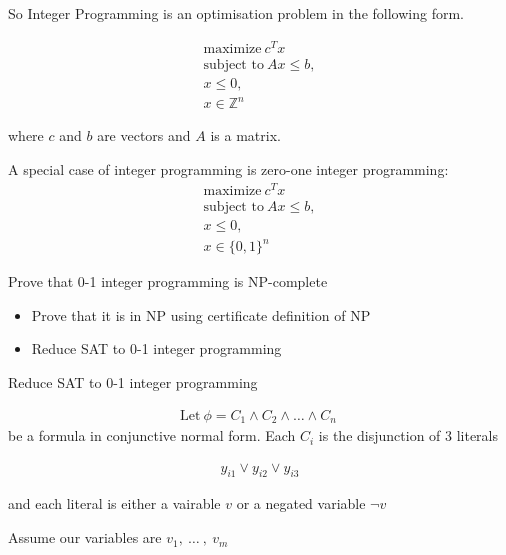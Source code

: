 \documentclass[mathserif]{beamer}
\begin{document}
\begin{frame}
So Integer Programming is an optimisation problem in the following form.

\begin{align*}
\text{maximize}\ c^Tx\\
\text{subject to}\ Ax \leq b,\\
x \leq 0,\\
x \in \mathbb{Z}^n
\end{align*}

where $c$ and $b$ are vectors and $A$ is a matrix.

\end{frame}

\begin{frame}
A special case of integer programming is zero-one integer programming:
\begin{align*}
\text{maximize}\ c^Tx\\
\text{subject to}\ Ax \leq b,\\
x \leq 0,\\
x \in \{0, 1\}^n
\end{align*}
\end{frame}

\begin{frame}
Prove that 0-1 integer programming is NP-complete
\begin{itemize}
\item Prove that it is in NP using certificate definition of NP
\item Reduce SAT to 0-1 integer programming
\end{itemize}
\end{frame}


\begin{frame}
Reduce SAT to 0-1 integer programming

\begin{align*}
\text{Let}\ \phi = C_1 \wedge C_2 \wedge \ldots \wedge C_n\
\end{align*}
be a formula in conjunctive normal form. Each $C_i$ is the disjunction of 3 literals

\begin{align*}
y_{i1} \vee y_{i2} \vee y_{i3}
\end{align*}

and each literal is either a vairable $v$ or a negated variable $\neg v$

Assume our variables are $v_1,\ \ldots\ ,\ v_m$

\end{frame}
\end{document}
